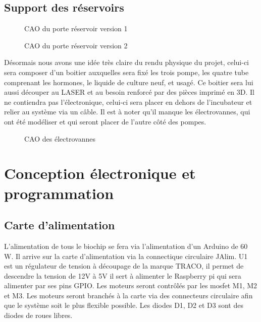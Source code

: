 \documentclass[a4paper, 11pt]{article}
\begin{document}
\subsection{Support des réservoirs}
\begin{multicols}{2}
    \begin{figure}[H]
        \centering
        \caption{CAO du porte réservoir version 1}
        \label{fig:CAO_reservoir1}
    \end{figure}
    \begin{figure}[H]
        \centering
        \caption{CAO du porte réservoir version 2}
        \label{fig:CAO_reservoir2}
    \end{figure}
\end{multicols}
Désormais nous avons une idée très claire du rendu physique du projet, celui-ci sera composer d'un boitier auxquelles sera fixé les trois pompe, les quatre tube comprenant les hormones, le liquide de culture neuf, et usagé.
Ce boitier sera lui aussi découper au LASER et au besoin renforcé par des pièces imprimé en 3D.
Il ne contiendra pas l'électronique, celui-ci sera placer en dehors de l'incubateur et relier au système via un câble.
Il est à noter qu'il manque les électrovannes, qui ont été modéliser et qui seront placer de l'autre côté des pompes.
\begin{figure}[H]
    \centering
    \caption{CAO des électrovannes}
    \label{fig:CAO_electrovanne}
\end{figure}

\newpage
\section{Conception électronique et programmation}
\subsection{Carte d'alimentation}
L'alimentation de tous le biochip se fera via l'alimentation d'un Arduino de 60 W.
Il arrive sur la carte d'alimentation via la connectique circulaire JAlim.
U1 est un régulateur de tension à découpage de la marque TRACO, il permet de descendre la tension de 12V à 5V il sert à alimenter le Raspberry pi qui sera alimenter par ses pins GPIO.
Les moteurs seront contrôlés par les mosfet M1, M2 et M3.
Les moteurs seront branchés à la carte via des connecteurs circulaire afin que le système soit le plus flexible possible.
Les diodes D1, D2 et D3 sont des diodes de roues libres.
\end{document}
